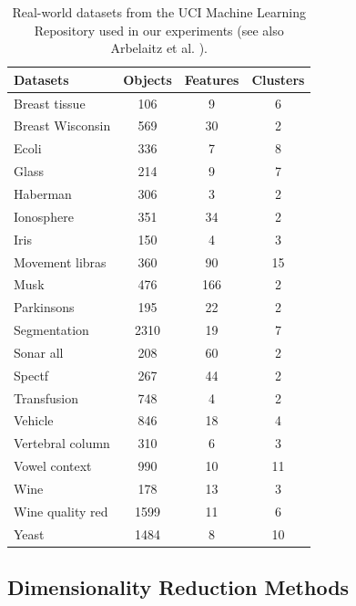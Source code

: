 \documentclass[preprint,12pt]{elsarticle}
\begin{document}
\begin{table}[h]
    \centering
    \caption{Real-world datasets from the UCI Machine Learning Repository used in our experiments (see also Arbelaitz et al. \cite{arbelaitz2013extensive}).}
    \label{tab:uci_datasets}
    \begin{tabular}{lccc}
        \toprule
        \textbf{Datasets} & \textbf{Objects} & \textbf{Features} & \textbf{Clusters} \\
        \midrule
        Breast tissue      & 106  & 9    & 6  \\
        Breast Wisconsin   & 569  & 30   & 2  \\
        Ecoli              & 336  & 7    & 8  \\
        Glass              & 214  & 9    & 7  \\
        Haberman           & 306  & 3    & 2  \\
        Ionosphere         & 351  & 34   & 2  \\
        Iris               & 150  & 4    & 3  \\
        Movement libras    & 360  & 90   & 15 \\
        Musk               & 476  & 166  & 2  \\
        Parkinsons         & 195  & 22   & 2  \\
        Segmentation       & 2310 & 19   & 7  \\
        Sonar all          & 208  & 60   & 2  \\
        Spectf             & 267  & 44   & 2  \\
        Transfusion        & 748  & 4    & 2  \\
        Vehicle            & 846  & 18   & 4  \\
        Vertebral column   & 310  & 6    & 3  \\
        Vowel context      & 990  & 10   & 11 \\
        Wine               & 178  & 13   & 3  \\
        Wine quality red    & 1599 & 11   & 6  \\
        Yeast              & 1484 & 8    & 10 \\
        \bottomrule
    \end{tabular}
\end{table}

\subsection{Dimensionality Reduction Methods} \label{subsec:dr_methods}
\end{document}
